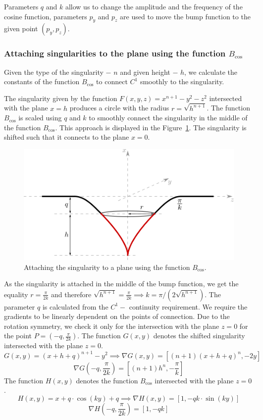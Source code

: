 Parameters $q$ and $k$ allow us to change the amplitude and the frequency of
the cosine function, parameters $p_y$ and $p_z$ are used to move the bump function
to the given point $(p_y, p_z)$.

\subsubsection*{Attaching singularities to the plane using the function $B_{\cos}$}

Given the type of the singularity $-$ $n$ and given height $-$ $h$, we calculate the
constants of the function $B_{\cos}$ to connect $C^1$ smoothly to the
singularity.

The singularity given by the function $F(x,y,z)=x^{n+1}-y^2-z^2$ intersected with 
the plane $x=h$ produces a circle with the radius $r=\sqrt{h^{n+1}}$.
The function $B_{\cos}$ is scaled using $q$ and $k$ to smoothly connect the
singularity in the middle of the function $B_{\cos}$. This approach is displayed
in the Figure~\ref{img:25}.  The singularity is shifted such that it connects
to the plane $x=0$.

\begin{figure}
    \centerline{\includegraphics[scale=0.5]{images/img25}}
    \caption[Attaching the singularity to a plane using the function $B_{\cos}$]
    {Attaching the singularity to a plane using the function $B_{\cos}$.}
    \label{img:25}
\end{figure}

As the singularity is attached in the middle of the
bump function, we get the equality $r=\frac{\pi}{2k}$ and therefore
$\sqrt{h^{n+1}}=\frac{\pi}{2k} \implies k=\pi/(2\sqrt{h^{n+1}})$.
The parameter $q$ is calculated from the $C^1-$ continuity requirement. We require the
gradients to be linearly dependent on the points of connection. Due to the rotation
symmetry, we check it only for the intersection with the plane $z=0$
for the point $P=(-q, \frac{\pi}{2k})$. 
The function $G(x, y)$ denotes the shifted singularity intersected with the plane $z=0$.
$$G(x, y)=(x+h+q)^{n+1}-y^2 \implies \nabla G(x, y) = \left[(n+1)(x+h+q)^n, -2y\right]$$
$$\nabla G \left(-q, \frac{\pi}{2k}\right) = \left[(n+1) h^n, -\frac{\pi}{k}\right]$$
The function $H(x, y)$ denotes the function $B_{\cos}$ intersected with the plane $z=0$.
$$H(x, y)=x+q \cdot \cos(k y)+q \implies \nabla H(x, y) = \left[1, -qk \cdot \sin(k y)\right]$$
$$\nabla H \left(-q, \frac{\pi}{2k}\right) = \left[1, -qk \right]$$

